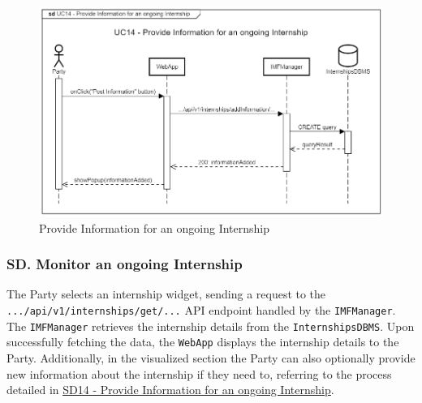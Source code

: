 \begin{figure}[H]
    \begin{center}
         \includegraphics[width=1\linewidth]{LaTeXCode/images/SequenceDiagrams/UC14-sequenceDiagram.png}
         \caption{Provide Information for an ongoing Internship}
         \label{fig:provide_information_ongoing_sd}
     \end{center}
\end{figure}

\newpage

\subsubsection*{SD\cuc. Monitor an ongoing Internship}
\label{subsubsec:monitor_internship_sd}
The Party selects an internship widget, sending a request to the \texttt{.../api/v1/internships/get/...} API endpoint handled by the \texttt{IMFManager}. The \texttt{IMFManager} retrieves the internship details from the \texttt{InternshipsDBMS}. Upon successfully fetching the data, the \texttt{WebApp} displays the internship details to the Party.
Additionally, in the visualized section the Party can also optionally provide new information about the internship if they need to, referring to the process detailed in \hyperref[fig:provide_information_ongoing_sd]{\protect\uline{SD14 - Provide Information for an ongoing Internship}}.

